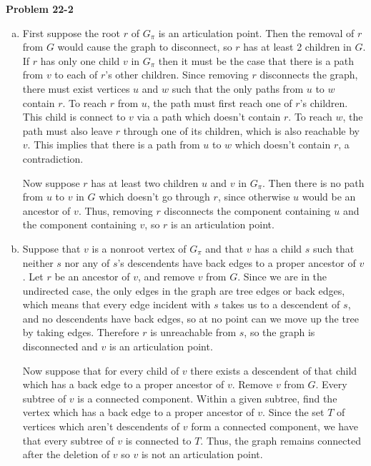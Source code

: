\documentclass{article}
\begin{document}
\noindent\textbf{Problem 22-2}\\
\begin{enumerate}[a.]
\item First suppose the root $r$ of $G_\pi$ is an articulation point. Then the removal of $r$ from $G$ would cause the graph to disconnect, so $r$ has at least 2 children in $G$.  If $r$ has only one child $v$ in $G_\pi$ then it must be the case that there is a path from $v$ to each of $r$'s other children. Since removing $r$ disconnects the graph, there must exist vertices $u$ and $w$ such that the only paths from $u$ to $w$ contain $r$. To reach $r$ from $u$, the path must first reach one of $r$'s children. This child is connect to $v$ via a path which doesn't contain $r$. To reach $w$, the path must also leave $r$ through one of its children, which is also reachable by $v$. This implies that there is a path from $u$ to $w$ which doesn't contain $r$, a contradiction.

Now suppose $r$ has at least two children $u$ and $v$ in $G_\pi$.  Then there is no path from $u$ to $v$ in $G$ which doesn't go through $r$, since otherwise $u$ would be an ancestor of $v$.  Thus, removing $r$ disconnects the component containing $u$ and the component containing $v$, so $r$ is an articulation point. \\

\item Suppose that $v$ is a nonroot vertex of $G_\pi$ and that $v$ has a child $s$ such that neither $s$ nor any of $s$'s descendents have back edges to a proper ancestor of $v$. Let $r$ be an ancestor of $v$, and remove $v$ from $G$.   Since we are in the undirected case, the only edges in the graph are tree edges or back edges, which means that every edge incident with $s$ takes us to a descendent of $s$, and no descendents have back edges, so at no point can we move up the tree by taking edges.  Therefore $r$ is unreachable from $s$, so the graph is disconnected and $v$ is an articulation point.  

Now suppose that for every child of $v$ there exists a descendent of that child which has a back edge to a proper ancestor of $v$.  Remove $v$ from $G$. Every subtree of $v$ is a connected component.  Within a given subtree, find the vertex which has a back edge to a proper ancestor of $v$.  Since the set $T$ of vertices which aren't descendents of $v$ form a connected component, we have that every subtree of $v$ is connected to $T$.  Thus, the graph remains connected after the deletion of $v$ so $v$ is not an articulation point. \\


\end{enumerate}
\end{document}
